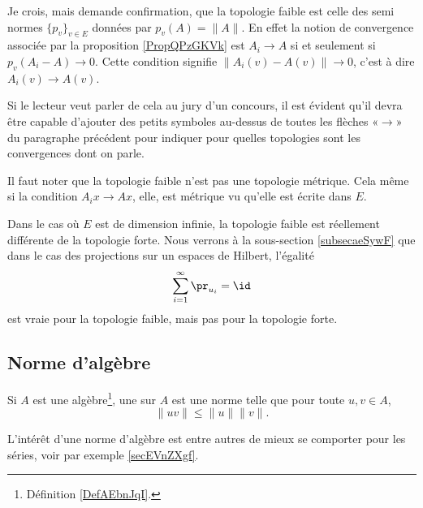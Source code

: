 \begin{probleme}
    Je crois, mais demande confirmation, que la topologie faible est celle des semi normes \( \{ p_v \}_{v\in E}\) données par \( p_v(A)=\| A \|\). En effet la notion de convergence associée par la proposition \ref{PropQPzGKVk} est \( A_i\to A\) si et seulement si \( p_v(A_i-A)\to 0\). Cette condition signifie \( \| A_i(v)-A(v) \|\to 0\), c'est à dire \( A_i(v)\to A(v)\).

    Si le lecteur veut parler de cela au jury d'un concours, il est évident qu'il devra être capable d'ajouter des petits symboles au-dessus de toutes les flèches «\( \to\)» du paragraphe précédent pour indiquer pour quelles topologies sont les convergences dont on parle.
\end{probleme}

\begin{remark}
    Il faut noter que la topologie faible n'est pas une topologie métrique. Cela même si la condition \( A_ix\to Ax\), elle, est métrique vu qu'elle est écrite dans \( E\).

    Dans le cas où \( E\) est de dimension infinie, la topologie faible est réellement différente de la topologie forte. Nous verrons à la sous-section \ref{subsecaeSywF} que dans le cas des projections sur un espaces de Hilbert, l'égalité
    \begin{equation}
        \sum_{i=1}^{\infty}\pr_{u_i}=\id
    \end{equation}
    est vraie pour la topologie faible, mais pas pour la topologie forte.
\end{remark}

\subsection{Norme d'algèbre}

\begin{definition}  \label{DefJWRWQue}
    Si \( A\) est une algèbre\footnote{Définition \ref{DefAEbnJqI}.}, une  sur \( A\) est une norme telle que pour toute \( u,v\in A\),
    \begin{equation}
        \| uv \|\leq \| u \|\| v \|.
    \end{equation}
\end{definition}
L'intérêt d'une norme d'algèbre est entre autres de mieux se comporter pour les séries, voir par exemple \ref{secEVnZXgf}.

